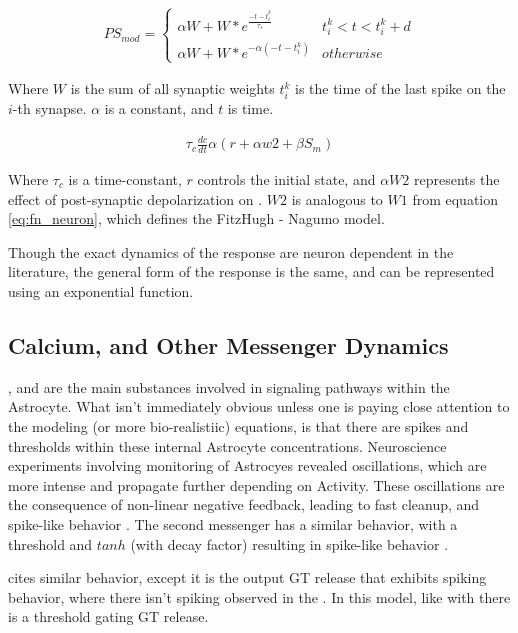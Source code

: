     \begin{align}
        PS_{mod} =
        \begin{cases}
          \alpha W + W * e^{\frac{-t - t^k_{i}}{\tau_s}} & t^k_{i} < t < t^k_{i}
          + d \\
          \alpha W + W * e^{-\alpha (-t - t^k_{i})} & otherwise
       \end{cases} \label{eq:kp_path_srm}      
    \end{align}

    Where $W$ is the sum of all synaptic weights $t^k_i$ is the time of the last
    spike on the $i$-th synapse. $\alpha$ is a constant, and $t$ is time.

    \begin{align}
      \tau_c \frac{dc}{dt} \alpha (r + \alpha w2 + \beta S_m) \label{eq:kp_path_fn}
    \end{align}

    Where $\tau_c$ is a time-constant, $r$ controls the initial state, and
    $\alpha W2$ represents the effect of post-synaptic depolarization on
    \ca. $W2$ is analogous to $W1$ from equation \ref{eq:fn_neuron}, which
    defines the FitzHugh - Nagumo model.

    Though the exact dynamics of the response are neuron dependent in the
    literature, the general form of the response is the same, and can be
    represented using an exponential function.
    
    \subsection{Calcium, and Other Messenger Dynamics}
    \ca, \ipt and \kp are the main substances involved in signaling pathways
    within the Astrocyte. What isn't immediately obvious unless one is paying
    close attention to the modeling (or more bio-realistiic) equations, is that
    there are spikes and thresholds within these internal Astrocyte
    concentrations. Neuroscience experiments involving monitoring of Astrocyes
    revealed oscillations, which are more intense and propagate further
    depending on Activity. These oscillations are the consequence of non-linear
    negative feedback, leading to fast cleanup, and spike-like behavior
    \cite{postnov_2009}. The second messenger \ipt has a similar behavior, with a
    threshold and $tanh$ (with decay factor) resulting in spike-like behavior
    \cite{postnov_2009}.

    \parencite{wade_2011} cites similar behavior, except it is the output GT release
    that exhibits spiking behavior, where there isn't spiking observed in the
    \ca. In this model, like with \parencite{postnov_2009} there is a threshold
    gating GT release.

